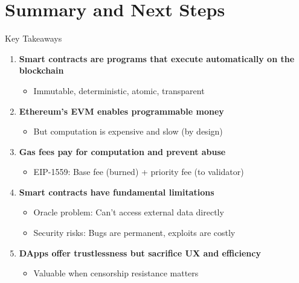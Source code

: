 \documentclass[10pt]{beamer}
\begin{document}
\section{Summary and Next Steps}

\begin{frame}{Key Takeaways}
  \begin{enumerate}
    \item \textbf{Smart contracts are programs that execute automatically on the blockchain}
    \begin{itemize}
      \item Immutable, deterministic, atomic, transparent
    \end{itemize}
    
    \vspace{0.3em}
    \item \textbf{Ethereum's EVM enables programmable money}
    \begin{itemize}
      \item But computation is expensive and slow (by design)
    \end{itemize}
    
    \vspace{0.3em}
    \item \textbf{Gas fees pay for computation and prevent abuse}
    \begin{itemize}
      \item EIP-1559: Base fee (burned) + priority fee (to validator)
    \end{itemize}
    
    \vspace{0.3em}
    \item \textbf{Smart contracts have fundamental limitations}
    \begin{itemize}
      \item Oracle problem: Can't access external data directly
      \item Security risks: Bugs are permanent, exploits are costly
    \end{itemize}
    
    \vspace{0.3em}
    \item \textbf{DApps offer trustlessness but sacrifice UX and efficiency}
    \begin{itemize}
      \item Valuable when censorship resistance matters
    \end{itemize}
  \end{enumerate}
\end{frame}
\end{document}
